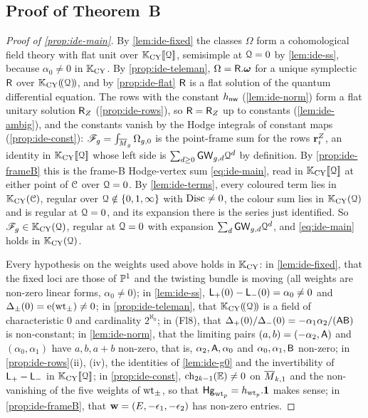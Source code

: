 \subsection{Proof of Theorem~B}

\begin{proof}[Proof of \cref{prop:ide-main}]
By \cref{lem:ide-fixed} the classes $\Omega$ form a cohomological field theory with flat unit over $\mathbb{K}_{\mathrm{CY}}[\![ \mathcal{Q} ]\!]$, semisimple at $\mathcal{Q}=0$ by \cref{lem:ide-ss}, because $\alpha_0\neq 0$ in $\mathbb{K}_{\mathrm{CY}}$. By \cref{prop:ide-teleman}, $\Omega=\mathsf{R}.\boldsymbol{\omega}$ for a unique symplectic $\mathsf{R}$ over $\mathbb{K}_{\mathrm{CY}}(\!(\mathcal{Q})\!)$, and by \cref{prop:ide-flat} $\mathsf{R}$ is a flat solution of the quantum differential equation. The rows with the constant $h_{\mathsf{nw}}$ (\cref{lem:ide-norm}) form a flat unitary solution $\mathsf{R}_{Z}$ (\cref{prop:ide-rows}), so $\mathsf{R}=\mathsf{R}_{Z}$ up to constants (\cref{lem:ide-ambig}), and the constants vanish by the Hodge integrals of constant maps (\cref{prop:ide-const}): $\mathscr{F}_g=\int_{\overline{M}_g}\Omega_{g,0}$ is the point-frame sum for the rows $\mathbf{r}^Z_i$, an identity in $\mathbb{K}_{\mathrm{CY}}[\![ \mathcal{Q} ]\!]$ whose left side is $\sum_{d\geq 0}\mathsf{GW}_{g,d}\mathcal{Q}^d$ by definition. By \cref{prop:ide-frameB} this is the frame-B Hodge-vertex sum \cref{eq:ide-main}, read in $\mathbb{K}_{\mathrm{CY}}[\![ \mathcal{Q} ]\!]$ at either point of $\mathcal{C}$ over $\mathcal{Q}=0$. By \cref{lem:ide-terms}, every coloured term lies in $\mathbb{K}_{\mathrm{CY}}(\mathcal{C})$, regular over $\mathcal{Q}\notin\{0,1,\infty\}$ with $\operatorname{Disc}\neq 0$, the colour sum lies in $\mathbb{K}_{\mathrm{CY}}(\mathcal{Q})$ and is regular at $\mathcal{Q}=0$, and its expansion there is the series just identified. So $\mathscr{F}_g\in\mathbb{K}_{\mathrm{CY}}(\mathcal{Q})$, regular at $\mathcal{Q}=0$ with expansion $\sum_d\mathsf{GW}_{g,d}\mathcal{Q}^d$, and \cref{eq:ide-main} holds in $\mathbb{K}_{\mathrm{CY}}(\mathcal{Q})$.

Every hypothesis on the weights used above holds in $\mathbb{K}_{\mathrm{CY}}$: in \cref{lem:ide-fixed}, that the fixed loci are those of $\mathbb{P}^1$ and the twisting bundle is moving (all weights are non-zero linear forms, $\alpha_0\neq 0$); in \cref{lem:ide-ss}, $\mathsf{L}_+(0)-\mathsf{L}_-(0)=\alpha_0\neq 0$ and $\Delta_\pm(0)=\mathrm{e}(\mathrm{wt}_\pm)\neq 0$; in \cref{prop:ide-teleman}, that $\mathbb{K}_{\mathrm{CY}}(\!(\mathcal{Q})\!)$ is a field of characteristic $0$ and cardinality $2^{\aleph_0}$; in (Fl8), that $\Delta_+(0)/\Delta_-(0)=-\alpha_1\alpha_2/(\mathsf{A}\mathsf{B})$ is non-constant; in \cref{lem:ide-norm}, that the limiting pairs $(a,b)=(-\alpha_2,\mathsf{A})$ and $(\alpha_0,\alpha_1)$ have $a,b,a+b$ non-zero, that is, $\alpha_2,\mathsf{A},\alpha_0$ and $\alpha_0,\alpha_1,\mathsf{B}$ non-zero; in \cref{prop:ide-rows}(ii), (iv), the identities of \cref{lem:ide-g0} and the invertibility of $\mathsf{L}_+-\mathsf{L}_-$ in $\mathbb{K}_{\mathrm{CY}}[\![ \mathcal{Q} ]\!]$; in \cref{prop:ide-const}, $\mathrm{ch}_{2k-1}(\mathbb{E})\neq 0$ on $\overline{M}_{k,1}$ and the non-vanishing of the five weights of $\mathrm{wt}_\pm$, so that $\mathsf{Hg}_{\mathrm{wt}_p}=h_{\mathrm{wt}_p}.\mathbf{1}$ makes sense; in \cref{prop:ide-frameB}, that $\mathbf{w}=(E,-\epsilon_1,-\epsilon_2)$ has non-zero entries.
\end{proof}

